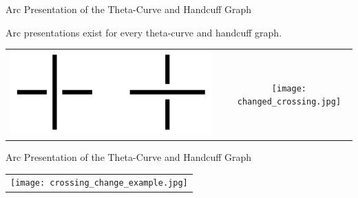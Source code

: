 \begin{frame}{Arc Presentation of the Theta-Curve and Handcuff Graph}
	\begin{thm}
    Arc presentations exist for every theta-curve and handcuff graph. 
	\end{thm}
	\mypf
    \begin{center}
    \begin{tabu}{c c c}
        \includegraphics[width=0.4\linewidth]{figure/crossings.png} &
        \raisebox{1cm}{$\xmapsto{}$} &
        \texttt{[image: changed\_crossing.jpg]}
    \end{tabu}
    \end{center}
\end{frame}

\begin{frame}{Arc Presentation of the Theta-Curve and Handcuff Graph}
	\mypf
    \begin{center}
    \begin{tabu}{c}
        \texttt{[image: crossing\_change\_example.jpg]}
    \end{tabu}
    \end{center}
\end{frame}


